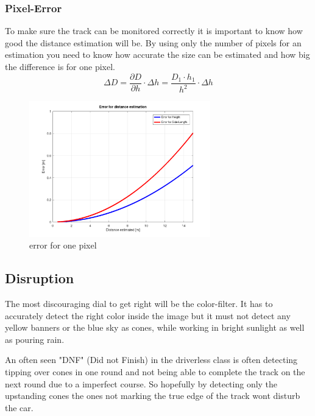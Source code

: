 \documentclass[10pt,a4paper]{article}
\begin{document}
	\subsubsection{Pixel-Error}
	To make sure the track can be monitored correctly it is important to know how good the distance estimation will be. By using only the number of pixels for an estimation you need to know how accurate the size can be estimated and how big the difference is for one pixel.
	$$\Delta D = \frac{\partial D}{\partial h} \cdot \Delta h = \frac{D_1 \cdot h_1}{h^2} \cdot \Delta h$$
	\begin{figure}[h]
		\centering
		\includegraphics[width=0.7\textwidth]{Abb/pixel-error.png}
		\caption{error for one pixel}
		\label{error-pixel}
	\end{figure}
	
	\subsection{Disruption} \label{disruption}
	The most discouraging dial to get right will be the color-filter. It has to accurately detect the right color inside the image but it must not detect any yellow banners or the blue sky as cones, while working in bright sunlight as well as pouring rain.
	
	An often seen "DNF" (Did not Finish) in the driverless class is often detecting tipping over cones in one round and not being able to complete the track on the next round due to a imperfect course. So hopefully by detecting only the upstanding cones the ones not marking the true edge of the track wont disturb the car.
	
\end{document}
